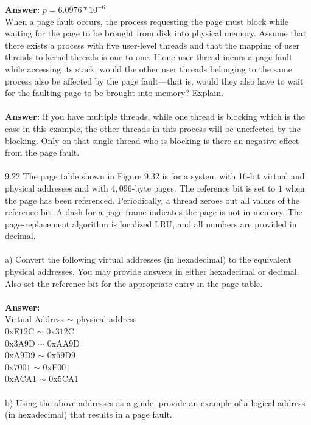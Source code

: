\documentclass[12pt]{article}
\begin{document}
\textbf{Answer: } $p = 6.0976*10^{-6}$\\
When a page fault occurs, the process requesting the page must block
while waiting for the page to be brought from disk into physical memory.
Assume that there exists a process with five user-level threads and that
the mapping of user threads to kernel threads is one to one. If one user
thread incurs a page fault while accessing its stack, would the other
user threads belonging to the same process also be affected by the page
fault—that is, would they also have to wait for the faulting page to be
brought into memory? Explain.\\\\
\textbf{Answer: }If you have multiple threads, while one thread is blocking which is the case
in this example, the other threads in this process will be uneffected by 
the blocking.  Only on that single thread who is blocking is there an 
negative effect from the page fault.\\\\
9.22 The page table shown in Figure $9.32$ is for a system with 16-bit virtual
and physical addresses and with $4,096$-byte pages. The reference bit is
set to $1$ when the page has been referenced. Periodically, a thread zeroes
out all values of the reference bit. A dash for a page frame indicates
the page is not in memory. The page-replacement algorithm is localized
LRU, and all numbers are provided in decimal.\\\\
a) Convert the following virtual addresses (in hexadecimal) to the
equivalent physical addresses. You may provide answers in either 
hexadecimal or decimal. Also set the reference bit for the appropriate
entry in the page table.\\\\
\textbf{Answer: }\\
Virtual Address $\sim$ physical address\\
$0$xE$12$C $\sim$ $0$x$312$C\\
$0$x$3$A$9$D $\sim$ $0$xAA$9$D\\
$0$xA$9$D$9$ $\sim$ $0$x$59$D$9$\\
$0$x$7001$ $\sim$ $0$xF$001$\\
$0$xACA$1$ $\sim$ $0$x$5$CA$1$
\\\\
b) Using the above addresses as a guide, provide an example of a
logical address (in hexadecimal) that results in a page fault.\\\\
\end{document}
